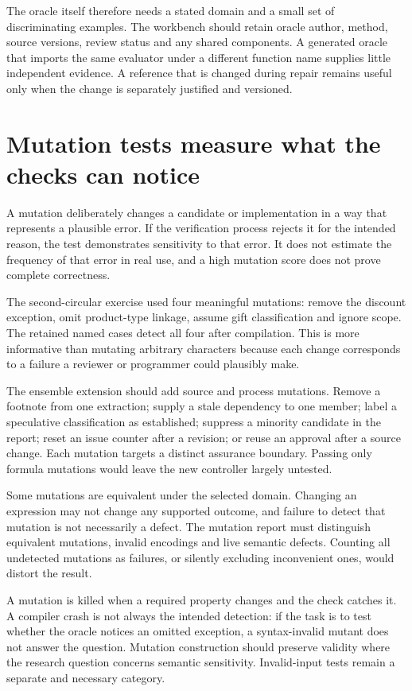 \documentclass[12pt,a4paper,oneside,openany]{book}
\begin{document}
The oracle itself therefore needs a stated domain and a small set of discriminating
examples. The workbench should retain oracle author, method, source versions,
review status and any shared components. A generated oracle that imports the same
evaluator under a different function name supplies little independent evidence.
A reference that is changed during repair remains useful only when the change is
separately justified and versioned.

\section{Mutation tests measure what the checks can notice}

A mutation deliberately changes a candidate or implementation in a way that
represents a plausible error. If the verification process rejects it for the
intended reason, the test demonstrates sensitivity to that error. It does not
estimate the frequency of that error in real use, and a high mutation score does
not prove complete correctness.

The second-circular exercise used four meaningful mutations: remove the discount
exception, omit product-type linkage, assume gift classification and ignore scope.
The retained named cases detect all four after compilation. This is more
informative than mutating arbitrary characters because each change corresponds
to a failure a reviewer or programmer could plausibly make.

The ensemble extension should add source and process mutations. Remove a footnote
from one extraction; supply a stale dependency to one member; label a speculative
classification as established; suppress a minority candidate in the report; reset
an issue counter after a revision; or reuse an approval after a source change.
Each mutation targets a distinct assurance boundary. Passing only formula
mutations would leave the new controller largely untested.

Some mutations are equivalent under the selected domain. Changing an expression
may not change any supported outcome, and failure to detect that mutation is not
necessarily a defect. The mutation report must distinguish equivalent mutations,
invalid encodings and live semantic defects. Counting all undetected mutations as
failures, or silently excluding inconvenient ones, would distort the result.

A mutation is killed when a required property changes and the check catches it.
A compiler crash is not always the intended detection: if the task is to test
whether the oracle notices an omitted exception, a syntax-invalid mutant does not
answer the question. Mutation construction should preserve validity where the
research question concerns semantic sensitivity. Invalid-input tests remain a
separate and necessary category.
\end{document}
